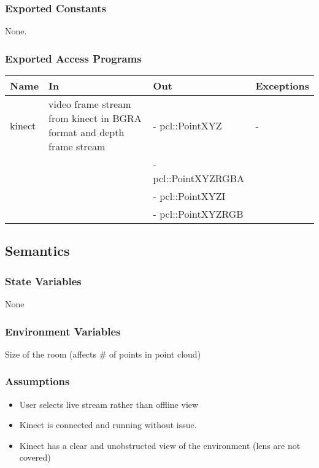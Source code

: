 \documentclass[12pt, titlepage]{article}
\begin{document}
\subsubsection{Exported Constants}

None.

\subsubsection{Exported Access Programs}

\begin{center}
\begin{tabular}{p{2cm} p{4cm} p{5cm} p{2cm}}
\hline
\textbf{Name} & \textbf{In} & \textbf{Out} & \textbf{Exceptions} \\
\hline
kinect & video frame stream from kinect in BGRA format and depth frame stream
& - pcl::PointXYZ & - \\
 & & - pcl::PointXYZRGBA &  \\
 & & - pcl::PointXYZI &  \\
 & & - pcl::PointXYZRGB &  \\
\hline
\end{tabular}
\end{center}

\subsection{Semantics}

\subsubsection{State Variables}

None

\subsubsection{Environment Variables}

Size of the room (affects \# of points in point cloud)

\subsubsection{Assumptions}

\begin{itemize}
  \item User selects live stream rather than offline view
  \item Kinect is connected and running without issue.
  \item Kinect has a clear and unobstructed view of the environment (lens are not covered)
\end{itemize}
\end{document}
